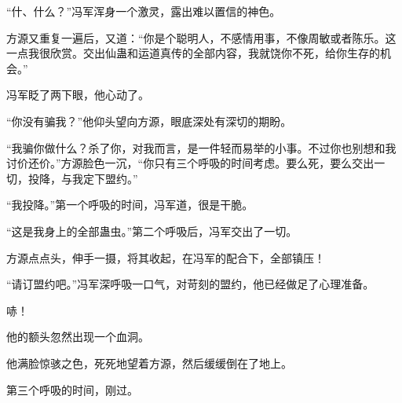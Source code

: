 \begin{this_body}
“什、什么？”冯军浑身一个激灵，露出难以置信的神色。

方源又重复一遍后，又道：“你是个聪明人，不感情用事，不像周敏或者陈乐。这一点我很欣赏。交出仙蛊和运道真传的全部内容，我就饶你不死，给你生存的机会。”

冯军眨了两下眼，他心动了。

“你没有骗我？”他仰头望向方源，眼底深处有深切的期盼。

“我骗你做什么？杀了你，对我而言，是一件轻而易举的小事。不过你也别想和我讨价还价。”方源脸色一沉，“你只有三个呼吸的时间考虑。要么死，要么交出一切，投降，与我定下盟约。”

“我投降。”第一个呼吸的时间，冯军道，很是干脆。

“这是我身上的全部蛊虫。”第二个呼吸后，冯军交出了一切。

方源点点头，伸手一摄，将其收起，在冯军的配合下，全部镇压！

“请订盟约吧。”冯军深呼吸一口气，对苛刻的盟约，他已经做足了心理准备。

哧！

他的额头忽然出现一个血洞。

他满脸惊骇之色，死死地望着方源，然后缓缓倒在了地上。

第三个呼吸的时间，刚过。

\end{this_body}

